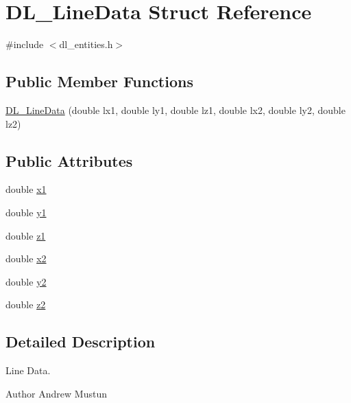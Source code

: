 \hypertarget{structDL__LineData}{\section{D\-L\-\_\-\-Line\-Data Struct Reference}
\label{structDL__LineData}
}


{\ttfamily \#include $<$dl\-\_\-entities.\-h$>$}

\subsection*{Public Member Functions}
\begin{DoxyCompactItemize}
\item 
\hyperlink{structDL__LineData_afe54f7feea6418f3f48cfdf16e339150}{D\-L\-\_\-\-Line\-Data} (double lx1, double ly1, double lz1, double lx2, double ly2, double lz2)
\end{DoxyCompactItemize}
\subsection*{Public Attributes}
\begin{DoxyCompactItemize}
\item 
double \hyperlink{structDL__LineData_a40e8e23e9a5bbabdbd65bbc3ce776a69}{x1}
\item 
double \hyperlink{structDL__LineData_a4e9aa2087e8f4789221d859c20176a6a}{y1}
\item 
double \hyperlink{structDL__LineData_af9f75af211622aa8ecfb6a3286c33078}{z1}
\item 
double \hyperlink{structDL__LineData_ab58b66255dc37f000dea00c39c0434ca}{x2}
\item 
double \hyperlink{structDL__LineData_af11da9e6e67cd3a85fa802fafafe9a81}{y2}
\item 
double \hyperlink{structDL__LineData_a88ecf764e9ee25a0357fc4cb85f4fc09}{z2}
\end{DoxyCompactItemize}


\subsection{Detailed Description}
Line Data.

\begin{DoxyAuthor}{Author}
Andrew Mustun 
\end{DoxyAuthor}


